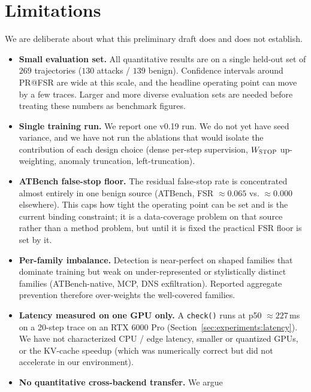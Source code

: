 \section{Limitations}
\label{sec:limitations}

We are deliberate about what this preliminary draft does and does not establish.

\begin{itemize}[leftmargin=1.4em,itemsep=0.2em]
  \item \textbf{Small evaluation set.} All quantitative results are on a single
        held-out set of $269$ trajectories ($130$ attacks / $139$ benign).
        Confidence intervals around PR@FSR are wide at this scale, and the
        headline operating point can move by a few traces. Larger and more
        diverse evaluation sets are needed before treating these numbers as
        benchmark figures.
  \item \textbf{Single training run.} We report one v0.19 run. We do not yet
        have seed variance, and we have not run the ablations that would isolate
        the contribution of each design choice (dense per-step supervision,
        $W_{\textsc{STOP}}$ up-weighting, anomaly truncation, left-truncation).
  \item \textbf{ATBench false-stop floor.} The residual false-stop rate is
        concentrated almost entirely in one benign source (ATBench,
        FSR $\approx 0.065$ vs. $\approx 0.000$ elsewhere). This caps how tight
        the operating point can be set and is the current binding constraint;
        it is a data-coverage problem on that source rather than a method
        problem, but until it is fixed the practical FSR floor is set by it.
  \item \textbf{Per-family imbalance.} Detection is near-perfect on shaped
        families that dominate training but weak on under-represented or
        stylistically distinct families (ATBench-native, MCP, DNS exfiltration).
        Reported aggregate prevention therefore over-weights the well-covered
        families.
  \item \textbf{Latency measured on one GPU only.} A \texttt{check()} runs at
        p50 $\approx 227$\,ms on a 20-step trace on an RTX 6000 Pro
        (Section~\ref{sec:experiments:latency}). We have not characterized CPU /
        edge latency, smaller or quantized GPUs, or the KV-cache speedup (which
        was numerically correct but did not accelerate in our environment).
  \item \textbf{No quantitative cross-backend transfer.} We argue

\end{itemize}
